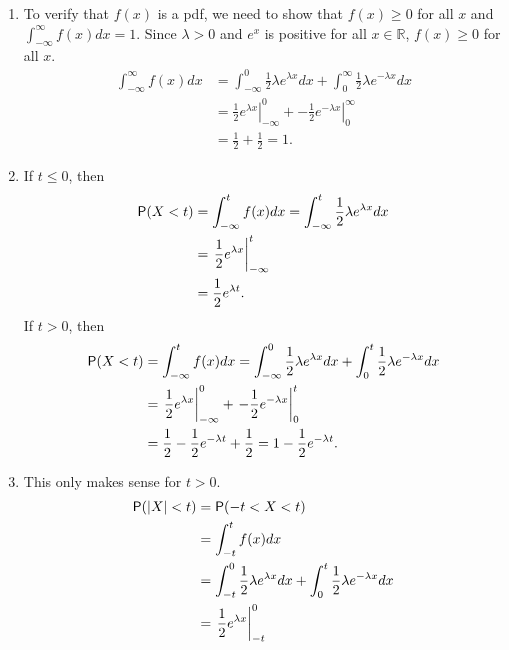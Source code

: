 \documentclass[12pt]{article}
\newcommand{\R}{{\mathbb R}}
\newcommand{\Prob}{{\sf P}}
\newenvironment{problem}[2][Problem]{\begin{trivlist}
\item[\hskip \labelsep {\bfseries #1}\hskip \labelsep {\bfseries #2.}]}
{\end{trivlist}}
\begin{document}
\begin{problem}{3}
\begin{itemize}
    \begin{enumerate}
      \item To verify that $f(x)$ is a pdf, we need to show that
      $f(x) \ge 0$ for all $x$ and $\int_{-\infty}^{\infty} f(x) dx = 1$.
      Since $\lambda > 0$ and $e^x$ is positive for all $x \in \R$, 
      $f(x) \ge 0$ for all $x$.
      \[
        \begin{aligned}
        \int_{-\infty}^{\infty} f(x) dx &= \int_{-\infty}^{0} 
        \frac12 \lambda e^{\lambda x} dx + \int_{0}^{\infty} 
        \frac12 \lambda e^{-\lambda x} dx \\
        &= \left. \frac12 e^{\lambda x} \right|_{-\infty}^{0} 
        + \left. -\frac12 e^{-\lambda x} \right|_{0}^{\infty} \\
        &= \frac12 + \frac12 = 1.
        \end{aligned}
      \]
      \item 
      If $t \le 0$, then
      \[
        \begin{aligned}
          \Prob(X < t) &= \int_{-\infty}^{t} f(x) dx
          = \int_{-\infty}^{t} \frac12 \lambda e^{\lambda x} dx \\
          &= \left. \frac12 e^{\lambda x} \right|_{-\infty}^{t} \\
          &= \frac12 e^{\lambda t}.
        \end{aligned}
      \]
      If $t > 0$, then
      \[
        \begin{aligned}
          \Prob(X < t) &= \int_{-\infty}^{t} f(x) dx
          = \int_{-\infty}^{0} \frac12 \lambda e^{\lambda x} dx
          + \int_{0}^{t} \frac12 \lambda e^{-\lambda x} dx \\
          &= \left. \frac12 e^{\lambda x} \right|_{-\infty}^{0}
          + \left. -\frac12 e^{-\lambda x} \right|_{0}^{t} \\
          &= \frac12 -\frac12 e^{-\lambda t} + \frac12 = 1 - 
          \frac12 e^{-\lambda t}.
        \end{aligned}
      \]
      \item This only makes sense for $t > 0$.
      \[
        \begin{aligned}
          \Prob(|X| < t) &= \Prob(-t < X < t) \\
          &= \int_{-t}^{t} f(x) dx \\
          &= \int_{-t}^{0} \frac12 \lambda e^{\lambda x} dx
          + \int_{0}^{t} \frac12 \lambda e^{-\lambda x} dx \\
          &= \left. \frac12 e^{\lambda x} \right|_{-t}^{0}

\end{aligned}\]
\end{enumerate}
\end{itemize}
\end{problem}
\end{document}
